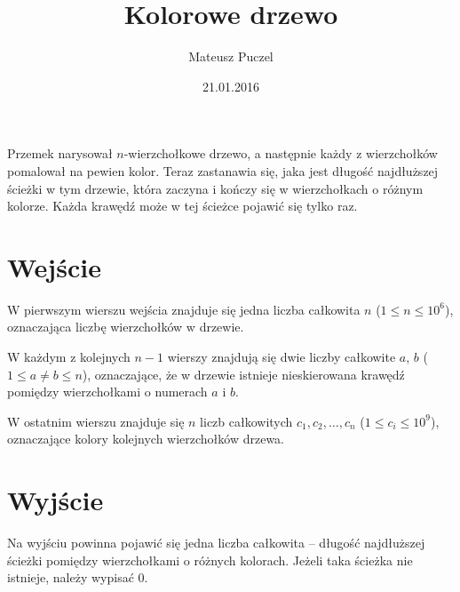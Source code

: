 \documentclass[zad,zawodnik,utf8]{sinol}
\title{Kolorowe drzewo}
\author{Mateusz Puczel} %
\date{21.01.2016}
\begin{document}
\begin{tasktext}%
Przemek narysował $n$-wierzchołkowe drzewo, a następnie każdy z wierzchołków pomalował na pewien kolor. Teraz zastanawia się,
jaka jest długość najdłuższej ścieżki w tym drzewie, która zaczyna i kończy się w wierzchołkach o różnym kolorze. Każda krawędź może
w tej ścieżce pojawić się tylko raz.

  \section{Wejście}
W pierwszym wierszu wejścia znajduje się jedna liczba całkowita $n$ ($1 \leq n \leq 10^6$), oznaczająca liczbę wierzchołków w drzewie.

W każdym z kolejnych $n - 1$ wierszy znajdują się dwie liczby całkowite $a$, $b$ ($1 \leq a \neq b \leq n$), oznaczające, że w drzewie istnieje
nieskierowana krawędź pomiędzy wierzchołkami o numerach $a$ i $b$.

W ostatnim wierszu znajduje się $n$ liczb całkowitych $c_1, c_2, \ldots, c_n$ ($1 \leq c_i \leq 10^9$), oznaczające kolory kolejnych wierzchołków drzewa.
  \section{Wyjście}
Na wyjściu powinna pojawić się jedna liczba całkowita -- długość najdłuższej ścieżki pomiędzy wierzchołkami o różnych kolorach.\newline
Jeżeli taka ścieżka nie istnieje, należy wypisać $0$.  
  \makecompactexample

\end{tasktext}
\end{document}
